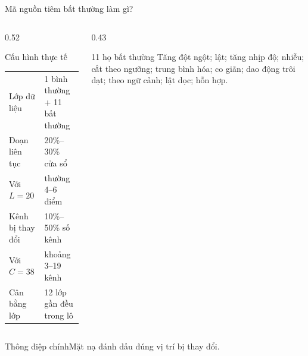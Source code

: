 \documentclass[aspectratio=169]{beamer}
\newcommand{\takeaway}[1]{\begin{alertblock}{Thông điệp chính}#1\end{alertblock}}
\begin{document}
\begin{frame}{Mã nguồn tiêm bất thường làm gì?}
  \scriptsize
  \begin{columns}[T,onlytextwidth]
    \begin{column}{0.52\textwidth}
      \begin{block}{Cấu hình thực tế}
        \setlength{\tabcolsep}{2pt}
        \begin{tabular}{ll}
          Lớp dữ liệu & 1 bình thường + 11 bất thường \\
          Đoạn liên tục & 20\%–30\% cửa sổ \\
          Với $L=20$ & thường 4–6 điểm \\
          Kênh bị thay đổi & 10\%–50\% số kênh \\
          Với $C=38$ & khoảng 3–19 kênh \\
          Cân bằng lớp & 12 lớp gần đều trong lô \\
        \end{tabular}
      \end{block}
    \end{column}
    \begin{column}{0.43\textwidth}
      \begin{exampleblock}{11 họ bất thường}
        Tăng đột ngột; lật; tăng nhịp độ; nhiễu; cắt theo ngưỡng; trung bình hóa; co giãn; dao động trôi dạt; theo ngữ cảnh; lật dọc; hỗn hợp.
      \end{exampleblock}
      \begin{center}
      \end{center}
    \end{column}
  \end{columns}
  \takeaway{Mặt nạ đánh dấu đúng vị trí bị thay đổi.}
\end{frame}
\end{document}
